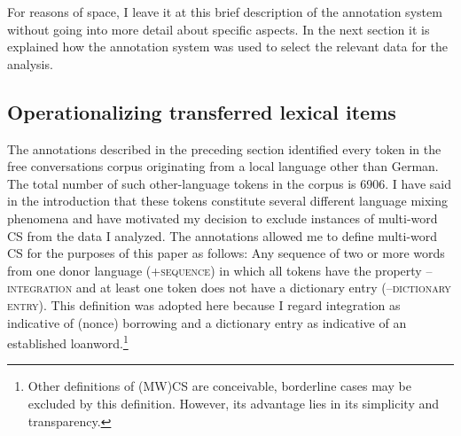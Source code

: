 \documentclass[output=paper]{langsci/langscibook}
\begin{document}
For reasons of space, I leave it at this brief description of the annotation system without going into more detail about specific aspects. In the next section it is explained how the annotation system was used to select the relevant data for the analysis.
  
\subsection{Operationalizing transferred lexical items}
\label{sec:bracke:4.3}


The annotations described in the preceding section identified every token in the free conversations corpus originating from a local language other than German. The total number of such other-language tokens in the corpus is 6906. I have said in the introduction that these tokens constitute several different language mixing phenomena and have motivated my decision to exclude instances of multi-word CS from the data I analyzed. The annotations allowed me to define multi-word CS for the purposes of this paper as follows: Any sequence of two or more words from one donor language (+\textsc{sequence}) in which all tokens have the property \textsc{–integration} and at least one token does not have a dictionary entry (–⁠\textsc{dictionary} \textsc{entry).} This definition was adopted here because I regard integration as indicative of (nonce) borrowing and a dictionary entry as indicative of an established loanword.\footnote{Other definitions of (MW)CS are conceivable, borderline cases may be excluded by this definition. However, its advantage lies in its simplicity and transparency.}
\end{document}
